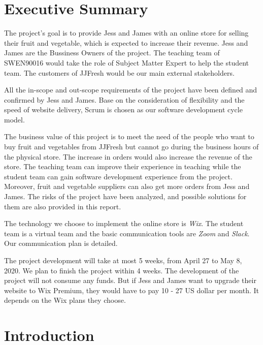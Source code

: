 \documentclass{report}
\begin{document}
\chapter*{Executive Summary}
  The project's goal is to provide Jess and James with an online store for selling their fruit and vegetable, which is expected to increase their revenue. Jess and James are the Bussiness Owners of the project. The teaching team of SWEN90016 would take the role of Subject Matter Expert to help the student team. The customers of JJFresh would be our main external stakeholders.

  All the in-scope and out-scope requirements of the project have been defined and confirmed by Jess and James. Base on the consideration of flexibility and the speed of website delivery, Scrum is chosen as our software development cycle model.

  The business value of this project is to meet the need of the people who want to buy fruit and vegetables from JJFresh but cannot go during the business hours of the physical store. The increase in orders would also increase the revenue of the store. The teaching team can improve their experience in teaching while the student team can gain software development experience from the project. Moreover, fruit and vegetable suppliers can also get more orders from Jess and James. The risks of the project have been analyzed, and possible solutions for them are also provided in this report. 

  The technology we choose to implement the online store is \textit{Wix}. The student team is a virtual team and the basic communication tools are \textit{Zoom} and \textit{Slack}. Our communication plan is detailed.

  The project development will take at most 5 weeks, from April 27 to May 8, 2020. We plan to finish the project within 4 weeks. The development of the project will not consume any funds. But if Jess and James want to upgrade their website to Wix Premium, they would have to pay 10 - 27 US dollar per month. It depends on the Wix plans they choose. 

\pagebreak
\clearpage

\tableofcontents
\pagebreak
\chapter{Introduction}
\label{chap:intro}
\end{document}
